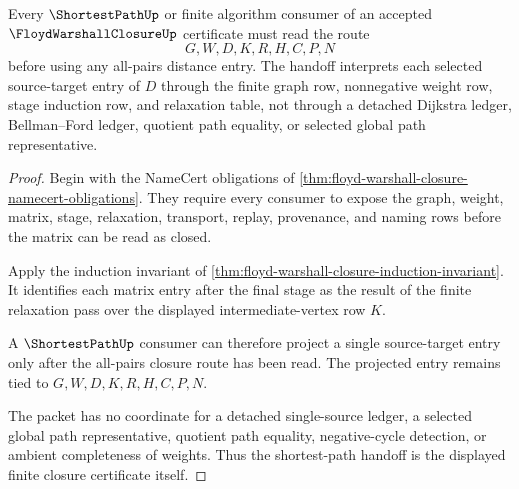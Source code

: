 \begin{theorem}
\label{thm:floyd-warshall-closure-shortestpath-handoff}
Every $\ShortestPathUp$ or finite algorithm consumer of an accepted $\FloydWarshallClosureUp$ certificate must read the route
$$
G,W,D,K,R,H,C,P,N
$$
before using any all-pairs distance entry. The handoff interprets each selected source-target entry of $D$ through the finite graph row, nonnegative weight row, stage induction row, and relaxation table, not through a detached Dijkstra ledger, Bellman--Ford ledger, quotient path equality, or selected global path representative.
\end{theorem}
\begin{proof}
Begin with the NameCert obligations of \autoref{thm:floyd-warshall-closure-namecert-obligations}. They require every consumer to expose the graph, weight, matrix, stage, relaxation, transport, replay, provenance, and naming rows before the matrix can be read as closed.

Apply the induction invariant of \autoref{thm:floyd-warshall-closure-induction-invariant}. It identifies each matrix entry after the final stage as the result of the finite relaxation pass over the displayed intermediate-vertex row $K$.

A $\ShortestPathUp$ consumer can therefore project a single source-target entry only after the all-pairs closure route has been read. The projected entry remains tied to $G,W,D,K,R,H,C,P,N$.

The packet has no coordinate for a detached single-source ledger, a selected global path representative, quotient path equality, negative-cycle detection, or ambient completeness of weights. Thus the shortest-path handoff is the displayed finite closure certificate itself.
\end{proof}



